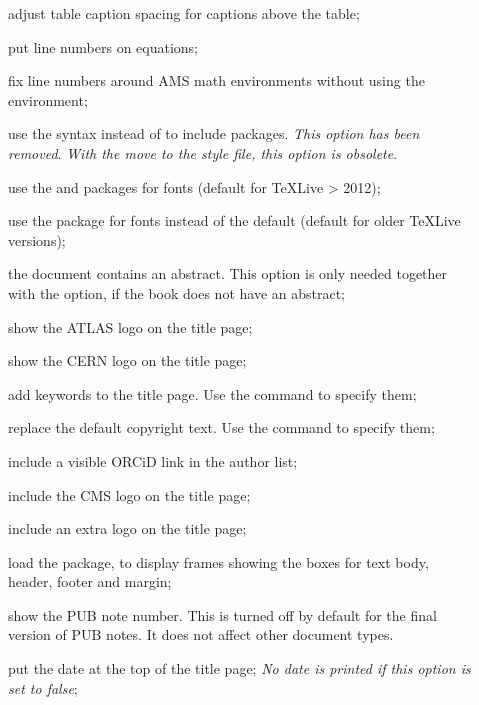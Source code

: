 \begin{description}
\item[] adjust table caption spacing for captions above the table;
\item[] put line numbers on equations;
\item[] fix line numbers around AMS math environments without using the  environment;
\item[] use the syntax 
  instead of  to include packages.
  \emph{ This option has been removed}.
  \emph{ With the move to the  style file, this option is obsolete}.
\item[] use the  and  packages for fonts 
  (default for \TeX Live > 2012);
\item[] use the  package for fonts instead of the default
  (default for older \TeX Live versions);
\item[] the document contains an abstract.
  This option is only needed together with the  option,
  if the book does not have an abstract;
\item[] show the ATLAS logo on the title page;
\item[] show the CERN logo on the title page;
\item[] add keywords to the title page.
  Use the command  to specify them;
\item[] replace the default copyright text.
  Use the command  to specify them;
\item[] include a visible ORCiD link in the author list;
\item[] include the CMS logo on the title page;
\item[] include an extra logo on the title page;
\item[] load the  package, to display frames showing the boxes for text body, header, footer and margin;
\item[] show the PUB note number.
  This is turned off by default for the final version of PUB notes.
  It does not affect other document types.
\item[] put the date at the top of the title page;
  \emph{ No date is printed if this option is set to false};
\end{description}

